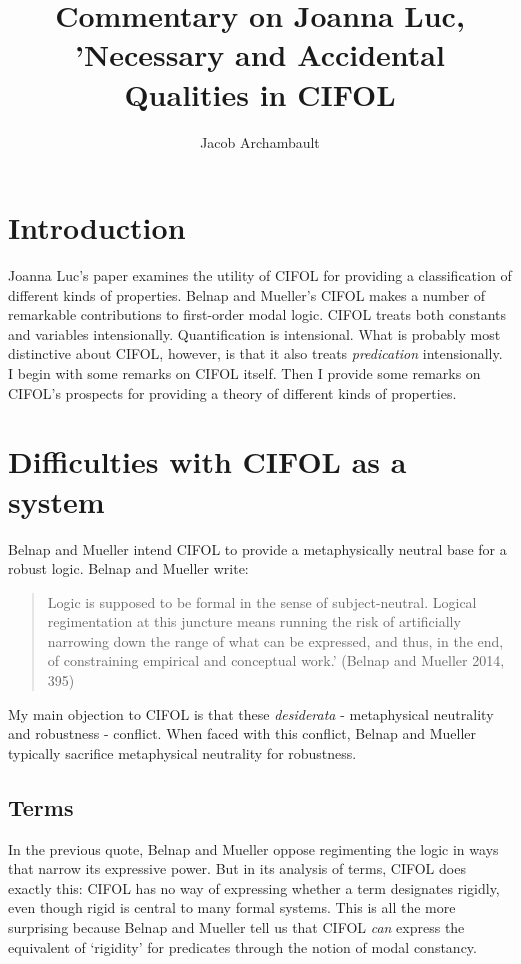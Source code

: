 \documentclass[]{article}
\title{Commentary on Joanna Luc, 'Necessary and Accidental Qualities in CIFOL}
\author{Jacob Archambault}
\begin{document}
\maketitle
\section{Introduction}
Joanna Luc's paper examines the utility of CIFOL for providing a classification of different kinds of properties. Belnap and Mueller's CIFOL makes a number of remarkable contributions to first-order modal logic. CIFOL treats both constants and variables intensionally. Quantification is intensional. What is probably most distinctive about CIFOL, however, is that it also treats \textit{predication} intensionally. I begin with some remarks on CIFOL itself. Then I provide some remarks on CIFOL's prospects for providing a theory of different kinds of properties.

\section{Difficulties with CIFOL as a system}
Belnap and Mueller intend CIFOL to provide a metaphysically neutral base for a robust logic. Belnap and Mueller write: 

\begin{quote}
Logic is supposed to be formal in the sense of subject-neutral. Logical regimentation at this juncture means running the risk of artificially narrowing down the range of what can be expressed, and thus, in the end, of constraining empirical and conceptual work.' (Belnap and Mueller 2014, 395)
\end{quote}

My main objection to CIFOL is that these \textit{desiderata} - metaphysical neutrality and robustness - conflict. When faced with this conflict, Belnap and Mueller typically sacrifice metaphysical neutrality for robustness.

\subsection{Terms}
In the previous quote, Belnap and Mueller oppose regimenting the logic in ways that narrow its expressive power. But in its analysis of terms, CIFOL does exactly this: CIFOL has no way of expressing whether a term designates rigidly, even though rigid is central to many formal systems. This is all the more surprising because Belnap and Mueller tell us that CIFOL \textit{can} express the equivalent of `rigidity' for predicates through the notion of modal constancy.
\end{document}
